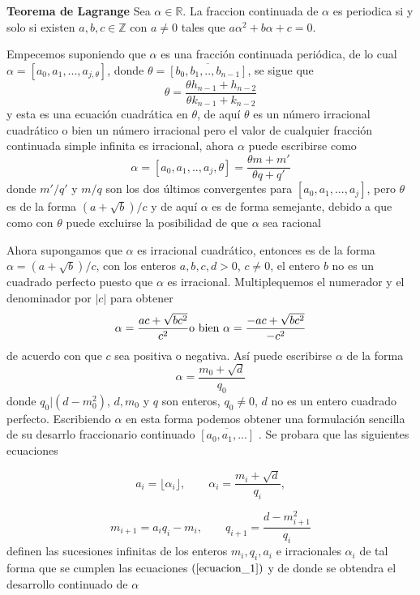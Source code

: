 \documentclass[11pt, article]{article}
\begin{document}
    

    \textbf{Teorema de Lagrange} Sea $\alpha \in \mathbb{R}$. La fraccion continuada de $\alpha$ es periodica si y solo si existen $a, b, c \in\mathbb{Z}$ con $a\not=0$ tales que $a\alpha^2 + b\alpha + c = 0$.

    Empecemos suponiendo que $\alpha$ es una fracción continuada periódica, de lo cual $\alpha= [a_0,a_1,...,a_{j,\theta}]$, donde $\theta=\overline{[b_0,b_1,..,b_{n-1}]}$, se sigue que
        \[
        \theta =\dfrac{\theta h_{n-1}+h_{n-2}}{\theta k_{n-1}+k_{n-2}}
        \]
    y esta es una ecuación cuadrática en $\theta$, de aquí $\theta$ es un número irracional cuadrático o bien un número irracional pero el valor de cualquier fracción continuada simple infinita es irracional, ahora $\alpha$ puede escribirse como 
        \[
        \alpha = [a_0,a_1,..,a_j,\theta]=\dfrac{\theta m + m'}{\theta q + q'}
        \]
    donde $m'/q'$ y $m/q$ son los dos últimos convergentes para $[a_0,a_1,...,a_j]$, pero $\theta$ es de la forma $(a + \sqrt{b})/c$ y de aquí $\alpha$ es de forma semejante, debido a que como con $\theta$ puede excluirse la posibilidad de que $\alpha$ sea racional

    Ahora supongamos que $\alpha$ es irracional cuadrático, entonces es de la forma $\alpha=(a+\sqrt{b})/c$, con los enteros $a,b,c,d>0$, $c\not=0$, el entero $b$ no es un cuadrado perfecto puesto que $\alpha$ es irracional. Multiplequemos el numerador y el denominador por $|c|$ para obtener 
        \[
        \alpha = \dfrac{ac + \sqrt{bc^2}}{c^2} \textnormal{o bien } \alpha=\dfrac{-ac+\sqrt{bc^2}}{-c^2}
        \]
    de acuerdo con que $c$ sea positiva o negativa. Así puede escribirse $\alpha$ de la forma
        \[
        \alpha = \dfrac{m_0+\sqrt{d}}{q_0}
        \]
    donde $q_0|(d-m_0^2)$, $d,m_0$ y $q$ son enteros, $q_0\not=0$, $d$ no es un entero cuadrado perfecto. Escribiendo $\alpha$ en esta forma podemos obtener una formulación sencilla de su desarrlo fraccionario continuado $\overline{[a_0,a_1,...]}$ . Se probara que las siguientes ecuaciones 

        \begin{equation}
        a_i= \lfloor \alpha_i \rfloor, \qquad \alpha_i=\dfrac{m_i+\sqrt{d}}{q_i}, \label{prueba_ecuacion}
        \end{equation}
        
        \[
        m_{i+1}=a_iq_i-m_i, \qquad q_{i+1}=\dfrac{d-m_{i+1}^2}{q_i}
        \] 
    definen las sucesiones infinitas de los enteros $m_i,q_i,a_i$ e irracionales $\alpha_i$ de tal forma que se cumplen las ecuaciones $(\ref{ecuacion_1})$ y de donde se obtendra el desarrollo continuado de $\alpha$
\end{document}
